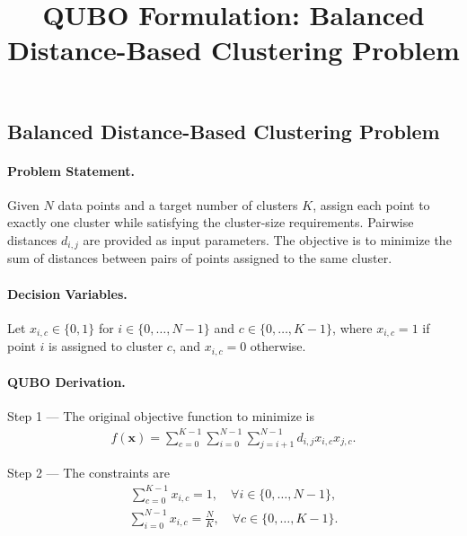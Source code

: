\documentclass[12pt]{article}
\title{QUBO Formulation: Balanced Distance-Based Clustering Problem}
\date{}
\begin{document}
\maketitle

\subsection*{Balanced Distance-Based Clustering Problem}

\paragraph{Problem Statement.}
Given $N$ data points and a target number of clusters $K$, assign each point to exactly one cluster while satisfying the cluster-size requirements. Pairwise distances $d_{i,j}$ are provided as input parameters. The objective is to minimize the sum of distances between pairs of points assigned to the same cluster.

\paragraph{Decision Variables.}
Let $x_{i,c} \in \{0,1\}$ for $i \in \{0,\dots,N-1\}$ and $c \in \{0,\dots,K-1\}$, where $x_{i,c} = 1$ if point $i$ is assigned to cluster $c$, and $x_{i,c} = 0$ otherwise.

\paragraph{QUBO Derivation.}
Step 1 --- The original objective function to minimize is
\begin{align}
  f(\mathbf{x}) = \sum_{c=0}^{K-1} \sum_{i=0}^{N-1} \sum_{j=i+1}^{N-1} d_{i,j} x_{i,c} x_{j,c}.
\end{align}

Step 2 --- The constraints are
\begin{align}
  \sum_{c=0}^{K-1} x_{i,c} = 1, \quad \forall i \in \{0,\dots,N-1\},
\end{align}
\begin{align}
  \sum_{i=0}^{N-1} x_{i,c} = \frac{N}{K}, \quad \forall c \in \{0,\dots,K-1\}.
\end{align}
\end{document}
